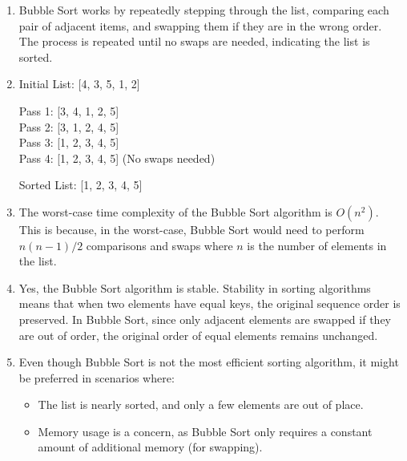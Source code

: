 \documentclass[12pt]{article}
\begin{document}
\begin{enumerate}[label=\textbf{\arabic*.}]

    \item Bubble Sort works by repeatedly stepping through the list, comparing each pair of adjacent items, and swapping them if they are in the wrong order. The process is repeated until no swaps are needed, indicating the list is sorted.
    
    \item 
    Initial List: [4, 3, 5, 1, 2]
    
    Pass 1: [3, 4, 1, 2, 5] \\
    Pass 2: [3, 1, 2, 4, 5] \\
    Pass 3: [1, 2, 3, 4, 5] \\
    Pass 4: [1, 2, 3, 4, 5] (No swaps needed)
    
    Sorted List: [1, 2, 3, 4, 5]

    \item The worst-case time complexity of the Bubble Sort algorithm is \(O(n^2)\). This is because, in the worst-case, Bubble Sort would need to perform \(n(n-1)/2\) comparisons and swaps where \(n\) is the number of elements in the list.
    
    \item Yes, the Bubble Sort algorithm is stable. Stability in sorting algorithms means that when two elements have equal keys, the original sequence order is preserved. In Bubble Sort, since only adjacent elements are swapped if they are out of order, the original order of equal elements remains unchanged.
    
    \item Even though Bubble Sort is not the most efficient sorting algorithm, it might be preferred in scenarios where:
    \begin{itemize}
        \item The list is nearly sorted, and only a few elements are out of place.
        \item Memory usage is a concern, as Bubble Sort only requires a constant amount of additional memory (for swapping).
    \end{itemize}

\end{enumerate}
\end{document}
